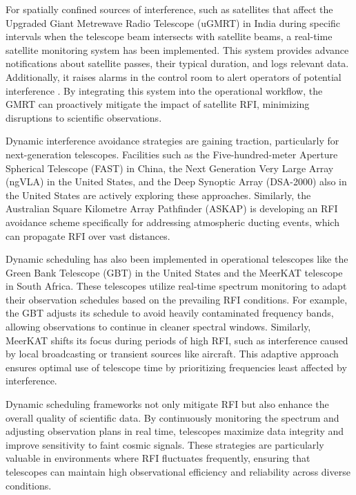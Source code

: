 For spatially confined sources of interference, such as satellites that affect the Upgraded Giant Metrewave Radio Telescope (uGMRT) in India during specific intervals when the telescope beam intersects with satellite beams, a real-time satellite monitoring system has been implemented. This system provides advance notifications about satellite passes, their typical duration, and logs relevant data. Additionally, it raises alarms in the control room to alert operators of potential interference \citep{raybole2016real}. By integrating this system into the operational workflow, the GMRT can proactively mitigate the impact of satellite RFI, minimizing disruptions to scientific observations.

Dynamic interference avoidance strategies are gaining traction, particularly for next-generation telescopes. Facilities such as the Five-hundred-meter Aperture Spherical Telescope (FAST) in China, the Next Generation Very Large Array (ngVLA) in the United States, and the Deep Synoptic Array (DSA-2000) also in the United States are actively exploring these approaches. Similarly, the Australian Square Kilometre Array Pathfinder (ASKAP) is developing an RFI avoidance scheme specifically for addressing atmospheric ducting events, which can propagate RFI over vast distances.

Dynamic scheduling has also been implemented in operational telescopes like the Green Bank Telescope (GBT) in the United States and the MeerKAT telescope in South Africa. These telescopes utilize real-time spectrum monitoring to adapt their observation schedules based on the prevailing RFI conditions. For example, the GBT adjusts its schedule to avoid heavily contaminated frequency bands, allowing observations to continue in cleaner spectral windows. Similarly, MeerKAT shifts its focus during periods of high RFI, such as interference caused by local broadcasting or transient sources like aircraft. This adaptive approach ensures optimal use of telescope time by prioritizing frequencies least affected by interference.

Dynamic scheduling frameworks not only mitigate RFI but also enhance the overall quality of scientific data. By continuously monitoring the spectrum and adjusting observation plans in real time, telescopes maximize data integrity and improve sensitivity to faint cosmic signals. These strategies are particularly valuable in environments where RFI fluctuates frequently, ensuring that telescopes can maintain high observational efficiency and reliability across diverse conditions.

